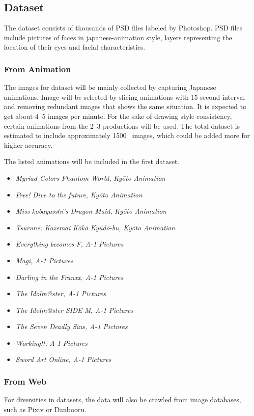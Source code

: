 \documentclass{article}
\begin{document}
\subsection{Dataset}
The dataset consists of thousands of PSD files labeled by Photoshop. PSD files include pictures of faces in japanese-animation style, layers representing the location of their eyes and facial characteristics.

\subsubsection{From Animation}
The images for dataset will be mainly collected by capturing Japanese animations.
Image will be selected by slicing animations with 15 second interval and removing redundant images that shows the same situation. It is expected to get about 4~5 images per minute.
For the sake of drawing style consistency, certain animations from the 2~3 productions will be used. The total dataset is estimated to include approximately 1500~ images, which could be added more for higher accuracy.

The listed animations will be included in the first dataset.
\begin{itemize}
\item \it{Myriad Colors Phantom World, Kyōto Animation}
\item \it{Free! Dive to the future, Kyōto Animation}
\item \it{Miss kobayasshi's Dragon Maid, Kyōto Animation}
\item \it{Tsurune: Kazemai Kōkō Kyūdō-bu, Kyōto Animation}

\item \it{Everything becomes F, A-1 Pictures}
\item \it{Magi, A-1 Pictures}
\item \it{Darling in the Franxx, A-1 Pictures}
\item \it{The Idolm@ster, A-1 Pictures}
\item \it{The Idolm@ster SIDE M, A-1 Pictures}
\item \it{The Seven Deadly Sins, A-1 Pictures}
\item \it{Working!!, A-1 Pictures}
\item \it{Sword Art Online, A-1 Pictures}
\end{itemize}

\subsubsection{From Web}
For diversities in datasets, the data will also be crawled from image databases, such as Pixiv or Danbooru.
\end{document}
